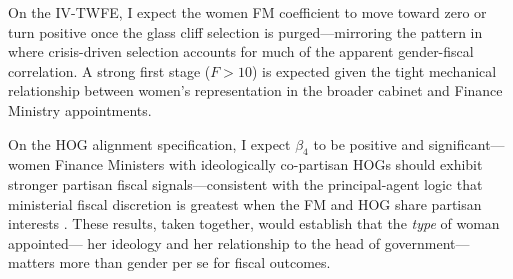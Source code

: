 \documentclass[12pt]{article}
\begin{document}
On the IV-TWFE, I expect the women FM coefficient to move toward zero or
turn positive once the glass cliff selection is purged---mirroring the
pattern in \citet{armstrong2024} where crisis-driven selection accounts for
much of the apparent gender-fiscal correlation. A strong first stage
($F > 10$) is expected given the tight mechanical relationship between
women's representation in the broader cabinet and Finance Ministry
appointments.

On the HOG alignment specification, I expect $\beta_4$ to be positive and
significant---women Finance Ministers with ideologically co-partisan HOGs
should exhibit stronger partisan fiscal signals---consistent with the
principal-agent logic that ministerial fiscal discretion is greatest when the
FM and HOG share partisan interests \citep{vanommeren2021}. These results,
taken together, would establish that the \textit{type} of woman appointed---
her ideology and her relationship to the head of government---matters more
than gender per se for fiscal outcomes.
\end{document}
